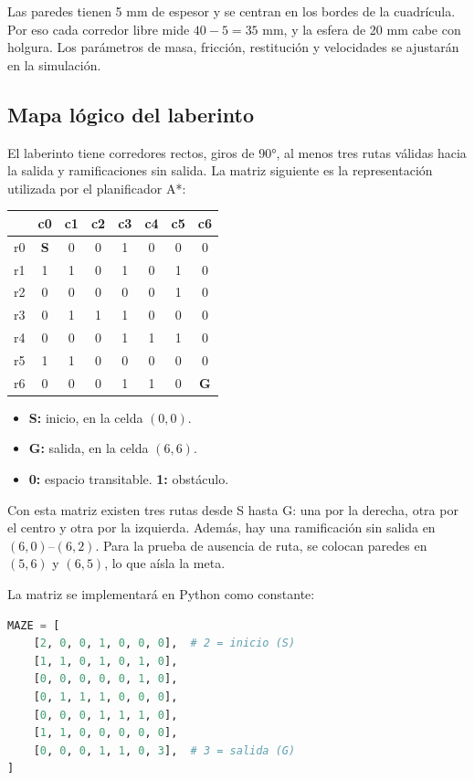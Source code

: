 \documentclass[11pt,a4paper]{article}
\begin{document}
Las paredes tienen 5 mm de espesor y se centran en los bordes de la cuadrícula. Por eso cada corredor libre mide $40 - 5 = 35$ mm, y la esfera de 20 mm cabe con holgura. Los parámetros de masa, fricción, restitución y velocidades se ajustarán en la simulación.

\subsection{Mapa lógico del laberinto}
El laberinto tiene corredores rectos, giros de 90°, al menos tres rutas válidas hacia la salida y ramificaciones sin salida. La matriz siguiente es la representación utilizada por el planificador A*:

\begin{center}
\begin{tabular}{c|ccccccc}
    \toprule
    & c0 & c1 & c2 & c3 & c4 & c5 & c6 \\
    \midrule
    r0 & \textbf{S} & 0 & 0 & 1 & 0 & 0 & 0 \\
    r1 & 1 & 1 & 0 & 1 & 0 & 1 & 0 \\
    r2 & 0 & 0 & 0 & 0 & 0 & 1 & 0 \\
    r3 & 0 & 1 & 1 & 1 & 0 & 0 & 0 \\
    r4 & 0 & 0 & 0 & 1 & 1 & 1 & 0 \\
    r5 & 1 & 1 & 0 & 0 & 0 & 0 & 0 \\
    r6 & 0 & 0 & 0 & 1 & 1 & 0 & \textbf{G} \\
    \bottomrule
\end{tabular}
\end{center}

\begin{itemize}
    \item \textbf{S:} inicio, en la celda $(0,0)$.
    \item \textbf{G:} salida, en la celda $(6,6)$.
    \item \textbf{0:} espacio transitable. \textbf{1:} obstáculo.
\end{itemize}

Con esta matriz existen tres rutas desde S hasta G: una por la derecha, otra por el centro y otra por la izquierda. Además, hay una ramificación sin salida en $(6,0)$–$(6,2)$. Para la prueba de ausencia de ruta, se colocan paredes en $(5,6)$ y $(6,5)$, lo que aísla la meta.

La matriz se implementará en Python como constante:
\begin{lstlisting}[language=Python, caption={Mapa lógico en Python (\texttt{maze.py}).}]
MAZE = [
    [2, 0, 0, 1, 0, 0, 0],  # 2 = inicio (S)
    [1, 1, 0, 1, 0, 1, 0],
    [0, 0, 0, 0, 0, 1, 0],
    [0, 1, 1, 1, 0, 0, 0],
    [0, 0, 0, 1, 1, 1, 0],
    [1, 1, 0, 0, 0, 0, 0],
    [0, 0, 0, 1, 1, 0, 3],  # 3 = salida (G)
]
\end{lstlisting}
\end{document}
